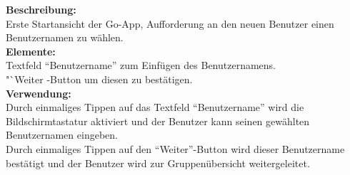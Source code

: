 \textbf{Beschreibung:}\\
Erste Startansicht der Go-App, Aufforderung an den neuen Benutzer einen Benutzernamen zu wählen.\\
\textbf{Elemente:}\\
Textfeld "`Benutzername"' zum Einfügen des Benutzernamens.\\
"`Weiter\grqq
-Button um diesen zu bestätigen.\\
\textbf{Verwendung:}\\
Durch einmaliges Tippen auf das Textfeld "`Benutzername"' wird die Bildschirmtastatur aktiviert und der Benutzer kann seinen gewählten Benutzernamen eingeben.\\
Durch einmaliges Tippen auf den "`Weiter"'-Button wird dieser Benutzername bestätigt und der Benutzer wird zur Gruppenübersicht weitergeleitet.


\clearpage
\newpage

